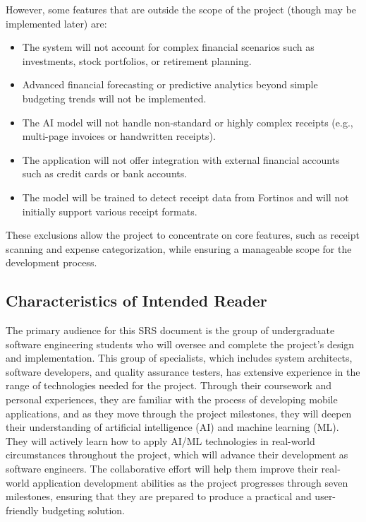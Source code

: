 \documentclass[12pt]{article}
\begin{document}
\noindent However, some features that are outside the scope of the project (though may be implemented later) are: 

\begin{itemize}
  \item The system will not account for complex financial scenarios such as investments, stock portfolios, or retirement planning.
  \item Advanced financial forecasting or predictive analytics beyond simple budgeting trends will not be implemented.
  \item The AI model will not handle non-standard or highly complex receipts (e.g., multi-page invoices or handwritten receipts).
  \item The application will not offer integration with external financial accounts such as credit cards or bank accounts.
  \item The model will be trained to detect receipt data from Fortinos and will not initially support various receipt formats.
\end{itemize}

\noindent These exclusions allow the project to concentrate on core features, such as receipt scanning and expense categorization, while ensuring a manageable scope for the development process.

\subsection{Characteristics of Intended Reader} \label{sec_IntendedReader}
The primary audience for this SRS document is the group of undergraduate
software engineering students who will oversee and complete the project’s design
and implementation. This group of specialists, which includes system architects,
software developers, and quality assurance testers, has extensive experience in
the range of technologies needed for the project. Through their coursework and
personal experiences, they are familiar with the process of developing mobile
applications, and as they move through the project milestones, they will deepen
their understanding of artificial intelligence (AI) and machine learning (ML).
They will actively learn how to apply AI/ML technologies in real-world
circumstances throughout the project, which will advance their development as
software engineers. The collaborative effort will help them improve their
real-world application development abilities as the project progresses through
seven milestones, ensuring that they are prepared to produce a practical and
user-friendly budgeting solution.
\end{document}
